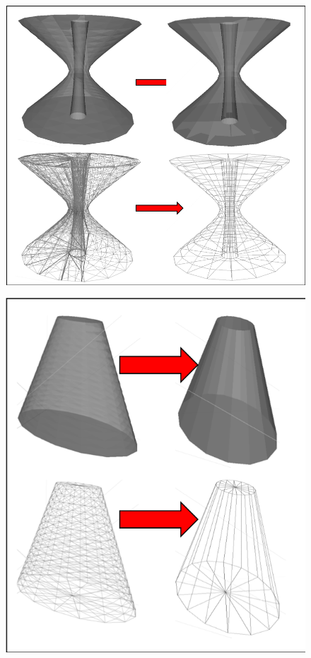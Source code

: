 \documentclass[12pt,a4paper]{article}
\begin{document}
\begin{figure}[h!]
\centering
\begin{minipage}{.4\textwidth}
  \centering
  \includegraphics[height=1\linewidth]{Images//Meshes//Hyperboloid.png}
  \label{polypic1}
\end{minipage}%
\hspace{1mm}
\begin{minipage}{.4\textwidth}
  \centering
  \includegraphics[height=1\linewidth]{Images//Meshes//ellipticalcone.png}

\end{minipage}
\end{figure}
\end{document}
